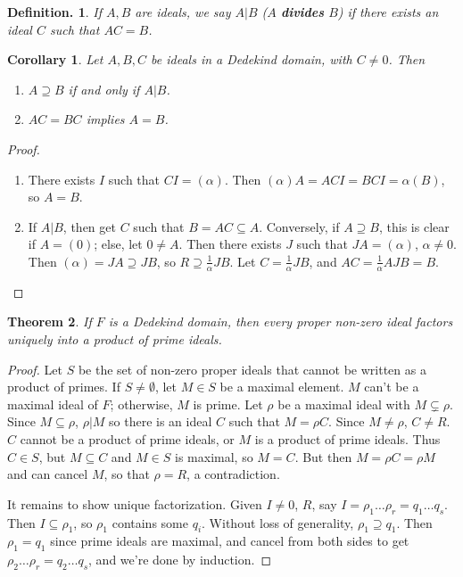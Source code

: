 \documentclass[11pt, a4paper]{memoir}
\theoremstyle{change}
\newtheorem{theorem}{Theorem}[section]
\newtheorem{corollary}[theorem]{Corollary}
\theoremstyle{plain}
\theoremstyle{nonumberplain}
\newtheorem{definition}{Definition.}
\newtheorem{proof}{Proof}
\begin{document}
\begin{definition}
    If $A,B$ are ideals, we say $A|B$ ($A$ \textbf{divides} $B$) if there exists an ideal $C$ such that $AC=B$.
\end{definition}
\begin{corollary}
    Let $A,B,C$ be ideals in a Dedekind domain, with $C\neq 0$.
    Then
    \begin{enumerate}[nolistsep,label=(\roman*)]
        \item $A\supseteq B$ if and only if $A|B$.
        \item $AC=BC$ implies $A=B$.
    \end{enumerate}
\end{corollary}
\begin{proof}
    \begin{enumerate}[label=(\roman*)]
        \item There exists $I$ such that $CI=(\alpha)$.
            Then $(\alpha)A=ACI=BCI=\alpha(B)$, so $A=B$.
        \item If $A|B$, then get $C$ such that $B=AC\subseteq A$.
            Conversely, if $A\supseteq B$, this is clear if $A=(0)$; else, let $0\neq A$.
            Then there exists $J$ such that $JA=(\alpha)$, $\alpha\neq 0$.
            Then $(\alpha)=JA\supseteq JB$, so $R\supseteq\frac{1}{\alpha}JB$.
            Let $C=\frac{1}{\alpha}JB$, and $AC=\frac{1}{\alpha}AJB=B$.
    \end{enumerate}
\end{proof}
\begin{theorem}
    If $F$ is a Dedekind domain, then every proper non-zero ideal factors uniquely into a product of prime ideals.
\end{theorem}
\begin{proof}
    Let $S$ be the set of non-zero proper ideals that cannot be written as a product of primes.
    If $S\neq\emptyset$, let $M\in S$ be a maximal element.
    $M$ can't be a maximal ideal of $F$; otherwise, $M$ is prime.
    Let $\rho$ be a maximal ideal with $M\subsetneq\rho$.
    Since $M\subseteq\rho$, $\rho|M$ so there is an ideal $C$ such that $M=\rho C$.
    Since $M\neq\rho$, $C\neq R$.
    $C$ cannot be a product of prime ideals, or $M$ is a product of prime ideals.
    Thus $C\in S$, but $M\subseteq C$ and $M\in S$ is maximal, so $M=C$.
    But then $M=\rho C=\rho M$ and can cancel $M$, so that $\rho=R$, a contradiction.

    It remains to show unique factorization.
    Given $I\neq 0$, $R$, say $I=\rho_1\ldots\rho_r=q_1\ldots q_s$.
    Then $I\subseteq\rho_1$, so $\rho_1$ contains some $q_i$.
    Without loss of generality, $\rho_1\supseteq q_1$.
    Then $\rho_1=q_1$ since prime ideals are maximal, and cancel from both sides to get $\rho_2\ldots\rho_r=q_2\ldots q_s$, and we're done by induction.
\end{proof}
\end{document}
